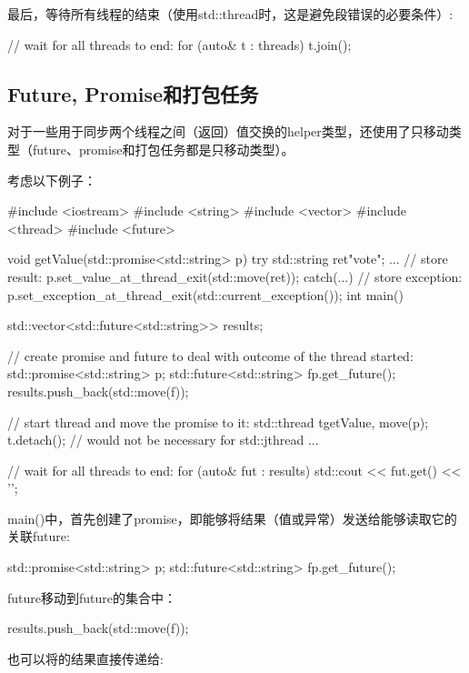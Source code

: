最后，等待所有线程的结束（使用std::thread时，这是避免段错误的必要条件）:

\begin{cppcode}
// wait for all threads to end:
for (auto& t : threads) {
	t.join();
}
\end{cppcode}

\subsection{Future, Promise和打包任务}

对于一些用于同步两个线程之间（返回）值交换的helper类型，还使用了只移动类型（future、promise和打包任务都是只移动类型）。

考虑以下例子：

\begin{cppcode}
#include <iostream>
#include <string>
#include <vector>
#include <thread>
#include <future>

void getValue(std::promise<std::string> p)
{
	try {
		std::string ret{"vote"};
		...
		// store result:
		p.set_value_at_thread_exit(std::move(ret));
	}
	catch(...) {
		// store exception:
		p.set_exception_at_thread_exit(std::current_exception());
	}
}
int main()
{
	std::vector<std::future<std::string>> results;

	// create promise and future to deal with outcome of the thread started:
	std::promise<std::string> p;
	std::future<std::string> f{p.get_future()};
	results.push_back(std::move(f));

	// start thread and move the promise to it:
	std::thread t{getValue, move(p)};
	t.detach(); // would not be necessary for std::jthread
	...

	// wait for all threads to end:
	for (auto& fut : results) {
		std::cout << fut.get() << '\n';
	}
}
\end{cppcode}

main()中，首先创建了promise，即能够将结果（值或异常）发送给能够读取它的关联future:

\begin{cppcode}
std::promise<std::string> p;
std::future<std::string> f{p.get_future()};
\end{cppcode}

future移动到future的集合中：

\begin{cppcode}
results.push_back(std::move(f));
\end{cppcode}

也可以将的结果直接传递给:

